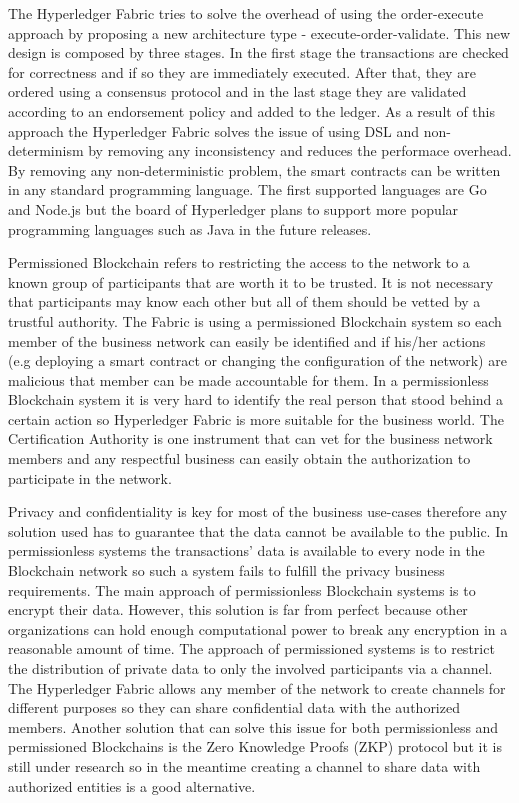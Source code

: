 The Hyperledger Fabric tries to solve the overhead of using the order-execute approach by proposing a new architecture type - execute-order-validate. This new design is composed by three stages. In the first stage the transactions are checked for correctness and if so they are immediately executed. After that, they are ordered using a consensus protocol and in the last stage they are validated according to an endorsement policy and added to the ledger. As a result of this approach the Hyperledger Fabric solves the issue of using DSL and non-determinism by removing any inconsistency and reduces the performace overhead. By removing any non-deterministic problem, the smart contracts can be written in any standard programming language. The first supported languages are Go and Node.js but the board of Hyperledger plans to support more popular programming languages such as Java in the future releases.

Permissioned Blockchain refers to restricting the access to the network to a known group of participants that are worth it to be trusted. It is not necessary that participants may know each other but all of them should be vetted by a trustful authority. The Fabric is using a permissioned Blockchain system so each member of the business network can easily be identified and if his/her actions (e.g deploying a smart contract or changing the configuration of the network) are malicious that member can be made accountable for them. In a permissionless Blockchain system it is very hard to identify the real person that stood behind a certain action so Hyperledger Fabric is more suitable for the business world. The Certification Authority is one instrument that can vet for the business network members and any respectful business can easily obtain the authorization to participate in the network.

Privacy and confidentiality is key for most of the business use-cases therefore any solution used has to guarantee that the data cannot be available to the public. 
In permissionless systems the transactions' data is available to every node in the Blockchain network so such a system fails to fulfill the privacy business requirements. The main approach of permissionless Blockchain systems is to encrypt their data. However, this solution is far from perfect because other organizations can hold enough computational power to break any encryption in a reasonable amount of time.
The approach of permissioned systems is to restrict the distribution of private data to only the involved participants via a channel. The Hyperledger Fabric allows any member of the network to create channels for different purposes so they can share confidential data with the authorized members.
Another solution that can solve this issue for both permissionless and permissioned Blockchains is the Zero Knowledge Proofs (ZKP) protocol but it is still under research so in the meantime creating a channel to share data with authorized entities is a good alternative.  

